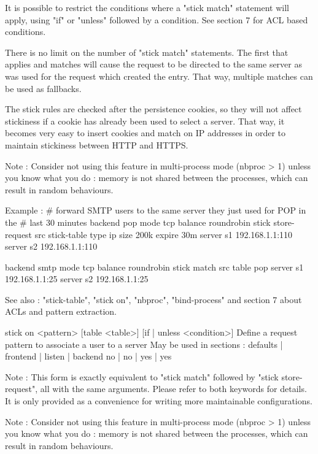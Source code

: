   It is possible to restrict the conditions where a "stick match" statement
  will apply, using "if" or "unless" followed by a condition. See section 7 for
  ACL based conditions.

  There is no limit on the number of "stick match" statements. The first that
  applies and matches will cause the request to be directed to the same server
  as was used for the request which created the entry. That way, multiple
  matches can be used as fallbacks.

  The stick rules are checked after the persistence cookies, so they will not
  affect stickiness if a cookie has already been used to select a server. That
  way, it becomes very easy to insert cookies and match on IP addresses in
  order to maintain stickiness between HTTP and HTTPS.

  Note : Consider not using this feature in multi-process mode (nbproc > 1)
         unless you know what you do : memory is not shared between the
         processes, which can result in random behaviours.

  Example :
    # forward SMTP users to the same server they just used for POP in the
    # last 30 minutes
    backend pop
        mode tcp
        balance roundrobin
        stick store-request src
        stick-table type ip size 200k expire 30m
        server s1 192.168.1.1:110
        server s2 192.168.1.1:110

    backend smtp
        mode tcp
        balance roundrobin
        stick match src table pop
        server s1 192.168.1.1:25
        server s2 192.168.1.1:25

  See also : "stick-table", "stick on", "nbproc", "bind-process" and section 7
             about ACLs and pattern extraction.


stick on <pattern> [table <table>] [{if | unless} <condition>]
  Define a request pattern to associate a user to a server
  May be used in sections :   defaults | frontend | listen | backend
                                 no    |    no    |   yes  |   yes

  Note : This form is exactly equivalent to "stick match" followed by
         "stick store-request", all with the same arguments. Please refer
         to both keywords for details. It is only provided as a convenience
         for writing more maintainable configurations.

  Note : Consider not using this feature in multi-process mode (nbproc > 1)
         unless you know what you do : memory is not shared between the
         processes, which can result in random behaviours.

